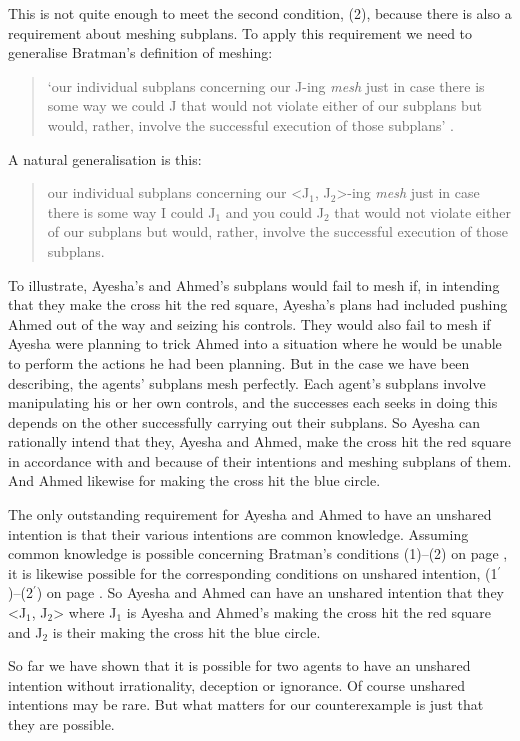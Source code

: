 \documentclass[12pt,\papersize]{extarticle}
\begin{document}
This is not quite enough to meet the second condition, (2), because there is also a requirement about meshing subplans. 
To apply this requirement we need to generalise Bratman's definition of meshing:
\begin{quote}
`our individual subplans concerning our J-ing \emph{mesh} just in case there is some way we could J that would not violate either of our subplans but would, rather, involve the successful execution of those subplans' \citep[p.\ 106]{Bratman:1993je}.
\end{quote}
A natural generalisation is this:
\begin{quote}
our individual subplans concerning our <J$_1$, J$_2$>-ing \emph{mesh} just in case there is some way I could J$_1$ and you could J$_2$ that would not violate either of our subplans but would, rather, involve the successful execution of those subplans. 
\end{quote}
%
To illustrate, 
Ayesha's and Ahmed's subplans would fail to mesh if, in intending that they make the cross hit the red square,  Ayesha's plans had included pushing Ahmed out of the way and seizing his controls. 
They would also fail to mesh if Ayesha were planning to trick Ahmed into a situation where he would be unable to perform the actions he had been planning.
But in the case we have been describing, the agents' subplans mesh perfectly.
Each agent's subplans involve manipulating his or her own controls,
and the successes each seeks in doing this depends on the other successfully carrying out their subplans.
So Ayesha can rationally intend that they, Ayesha and Ahmed, make the cross hit the red square in accordance with and because of their intentions and meshing subplans of them.
And Ahmed likewise for making the cross hit the blue circle.

The only outstanding requirement for Ayesha and Ahmed to have an unshared intention is that their various intentions are common knowledge. 
Assuming common knowledge is possible concerning Bratman's conditions (1)--(2) on page \pageref{quote:bratman_account}, 
it is likewise possible for the corresponding conditions on unshared intention, (1$^\prime$)--(2$^\prime$) on page  \pageref{df:unshared_intention}.
So Ayesha and Ahmed can have an unshared intention that they <J$_1$, J$_2$> where J$_1$ is Ayesha and Ahmed's making the cross hit the red square and J$_2$ is their making the cross hit the blue circle.

So far we have shown that it is possible for two agents to have an unshared intention without irrationality, deception or ignorance.
Of course unshared intentions may be rare. 
But what matters for our counterexample is just that they are possible. 
\end{document}
